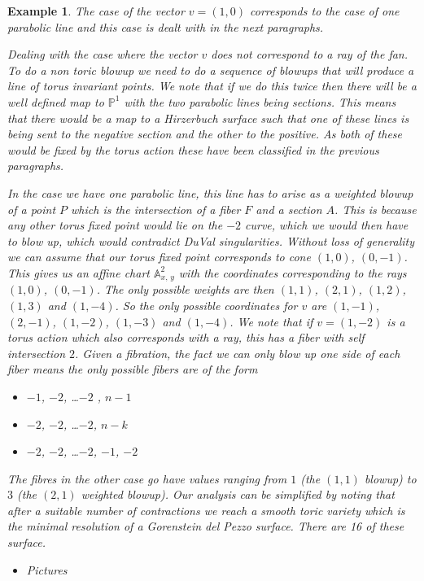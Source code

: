 \documentclass[11pt]{amsart}
\theoremstyle{plain}
\newtheorem{ex}[thm]{Example}
\newcommand{\mb}[1]{\mathbb{#1}}
\begin{document}
\begin{ex}
The case of the vector $v = (1,0)$ corresponds to the case of one parabolic line and this case is dealt with in the next paragraphs.


Dealing with the case where the vector $v$ does not correspond to a ray of the fan. To do a non toric blowup we need to do a  sequence of blowups that will produce a line of torus invariant points. We note that if we do this twice then there will be a well defined map to $\mb{P}^1$ with the two parabolic lines being sections. This means that there would be a map to a Hirzerbuch surface such that one of these lines is being sent to the negative section and the other to the positive. As both of these would be fixed by the torus action these have been classified in the previous paragraphs.


In the case we have one parabolic line, this line has to arise as a weighted blowup of a point $P$ which is the intersection of a fiber $F$ and a section $A$. This is because any other torus fixed point would lie on the $-2$ curve, which we would then have to blow up, which would contradict DuVal singularities. Without loss of generality we can assume that our torus fixed point corresponds to cone $(1,0)$, $(0, -1)$. This gives us an affine chart $\mb{A}^2_{x, \, y}$ with the coordinates corresponding to the rays $(1,0)$, $(0, -1)$. The only possible weights are then $(1,1)$, $(2,1)$, $(1,2)$, $(1,3)$ and $(1,-4)$. So the only possible coordinates for $v$ are $(1, -1)$, $(2, -1)$, $(1, -2)$, $(1, -3)$ and $(1,-4)$. We note that if $v = (1,-2)$ is a torus action which also corresponds with a ray, this has a fiber with self intersection $2$. Given a fibration, the fact we can only blow up one side of each fiber means the only possible fibers are of the form 

\begin{itemize}
\item $-1$, $-2$, \dots $-2$ , $n-1$
\item $-2$, $-2$, \dots $-2$, $n-k$
\item $-2$, $-2$, \dots $-2$, $-1$, $-2$

\end{itemize}

The fibres in the other case go have values ranging from $1$ (the $(1,1)$ blowup) to $3$ (the $(2,1)$ weighted blowup). Our analysis can be simplified by noting that after a suitable number of contractions we reach a smooth toric variety which is the minimal resolution of a Gorenstein del Pezzo surface. There are 16 of these surface. 

\begin{itemize}
\item Pictures
\end{itemize}

\end{ex}
\end{document}
